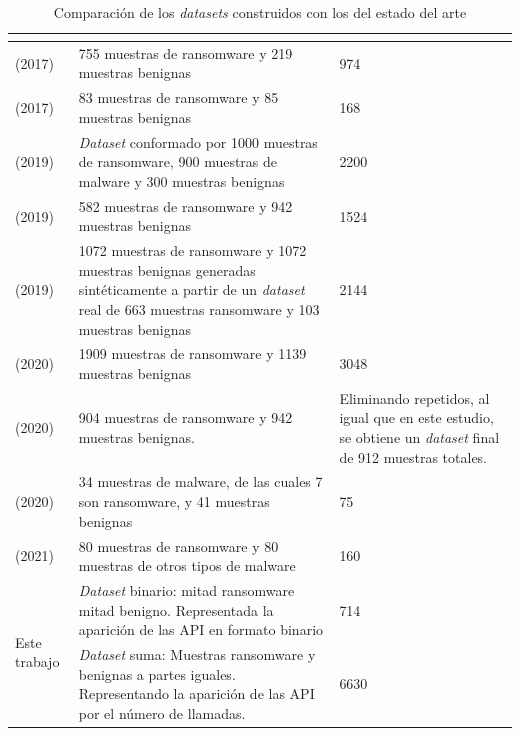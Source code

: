 \begin{table}[htb!]
    \centering
    \scriptsize %
    \caption{Comparación de los \textit{datasets} construidos con los del estado del arte}
    \label{tab:comparacionDatasets}
    \begin{tabular}{|p{}|p{}|p{}|}
        \hline
        \rowcolor[HTML]{C0C0C0}
        \multicolumn{1}{|c|}{\cellcolor[HTML]{C0C0C0}{\textbf{Trabajo}}} &
        \multicolumn{1}{c|}{\cellcolor[HTML]{C0C0C0}{\textbf{Distribución de las muestras}}} &
        \multicolumn{1}{c|}{\cellcolor[HTML]{C0C0C0}{\textbf{Tamaño total}}} \\ \hline
        \cite{shallow} (2017) & 755 muestras de ransomware y 219 muestras benignas & 974 \\ \hline
        \cite{flow} (2017) & 83 muestras de ransomware y 85 muestras benignas & 168 \\ \hline
        \cite{detecting} (2019) & \textit{Dataset} conformado por 1000 muestras de ransomware, 900 muestras de malware y 300 muestras benignas & 2200\\ \hline
        \cite{Kok2019} (2019) & 582 muestras de ransomware y 942 muestras benignas & 1524 \\ \hline
        \cite{entropy} (2019) & 1072 muestras de ransomware y 1072 muestras benignas generadas sintéticamente a partir de un \textit{dataset} real de 663 muestras ransomware y 103 muestras benignas & 2144\\ \hline
        \cite{two} (2020) & 1909 muestras de ransomware y 1139 muestras benignas & 3048 \\ \hline
        \cite{Kok2020} (2020) & 904 muestras de ransomware y 942 muestras benignas. & Eliminando repetidos, al igual que en este estudio, se obtiene un \textit{dataset} final de 912 muestras totales. \\ \hline
        \cite{ARABO2020289} (2020) & 34 muestras de malware, de las cuales 7 son ransomware, y 41 muestras benignas & 75 \\ \hline
        \cite{Aurangzeb2021} (2021) & 80 muestras de ransomware y 80 muestras de otros tipos de malware & 160 \\ \hline
        \multirow{2}{*}{Este trabajo} & \textit{Dataset} binario: mitad ransomware mitad benigno. Representada la aparición de las \gls{API} en formato binario & 714 \\ \cline{2-3}& \textit{Dataset} suma: Muestras ransomware y benignas a partes iguales. Representando la aparición de las \gls{API} por el número de llamadas. & 6630 \\ \hline
    \end{tabular}
\end{table}

